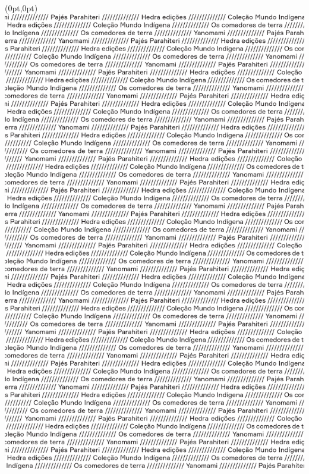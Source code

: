 \thispagestyle{empty}

\begin{textblock*}{-2in}(0pt,0pt)%
\vspace*{-2.4cm}
\hspace*{-3cm}\includegraphics[width=142mm]{./ABERTURA.png}  
\end{textblock*}

\pagebreak
\blankpage

\thispagestyle{empty}




